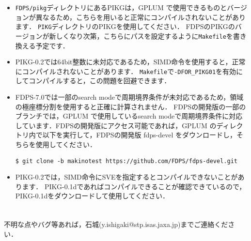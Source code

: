 \documentclass[12pt,a4paper,dvipdfmx]{jsarticle}
\newcommand{\ourcode}{GPLUM\xspace}
\begin{document}
\begin{itemize}
\item
\texttt{FDPS/pikg}ディレクトリにあるPIKGは，\ourcode で使用できるものとバージョンが異なるため，こちらを用いると正常にコンパイルされないことがあります．
\texttt{PIKG}ディレクトリのPIKGを使用してください．
FDPSのPIKGのバージョンが新しくなり次第，こちらにパスを設定するように\texttt{Makefile}を書き換える予定です．

\item
PIKG-0.2では64bit整数に未対応であるため，SIMD命令を使用すると，正常にコンパイルされないことがあります．
\texttt{Makefile}で\texttt{-DFOR\_PIKG01}を有効にしてコンパイルすると，この問題を回避できます．

\item
FDPS-7.0では一部のsearch modeで周期境界条件が未対応であるため，領域の極座標分割を使用すると正確に計算されません．
FDPSの開発版の一部のブランチでは，\ourcode で使用しているsearch modeで周期境界条件に対応しています．FDPSの開発版にアクセス可能であれば，\ourcode のディレクトリ内で以下を実行して，FDPSの開発版 fdps-devel をダウンロードし，そちらを使用してください．
\begin{verbatim}
$ git clone -b makinotest https://github.com/FDPS/fdps-devel.git
\end{verbatim}

\item
PIKG-0.2では，SIMD命令にSVEを指定するとコンパイルできないことがあります．
PIKG-0.1dであればコンパイルできることが確認できているので，PIKG-0.1dをダウンロードして使用してください．

\end{itemize}



\section*{}

不明な点やバグ等あれば，石城(y.ishigaki@stp.isas.jaxa.jp)までご連絡ください．
\end{document}
